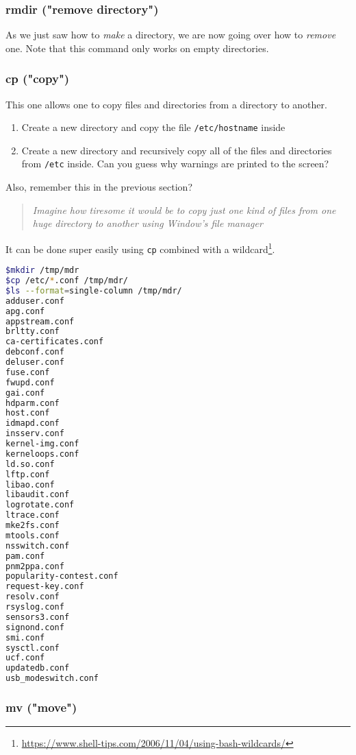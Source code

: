 \documentclass[12pt]{article}
\begin{document}
\subsubsection{rmdir ("remove directory")}

As we just saw how to \textit{make} a directory, we are now going over how to \textit{remove} one.
Note that this command only works on empty directories.

\subsubsection{cp ("copy")}

This one allows one to copy files and directories from a directory to another.
\begin{enumerate}
\item Create a new directory and copy the file \texttt{/etc/hostname} inside
\item Create a new directory and recursively copy all of the files and directories from \texttt{/etc} inside. Can you guess why warnings are printed to the screen?
\end{enumerate}

Also, remember this in the previous section?

\begin{quote}
\textit{Imagine how tiresome it would be to copy just one kind of files from one huge directory to another using Window's file manager}
\end{quote}

It can be done super easily using \texttt{cp} combined with a wildcard\footnote{\url{https://www.shell-tips.com/2006/11/04/using-bash-wildcards/}}.

\begin{lstlisting}[language=bash]
$mkdir /tmp/mdr
$cp /etc/*.conf /tmp/mdr/
$ls --format=single-column /tmp/mdr/
adduser.conf
apg.conf
appstream.conf
brltty.conf
ca-certificates.conf
debconf.conf
deluser.conf
fuse.conf
fwupd.conf
gai.conf
hdparm.conf
host.conf
idmapd.conf
insserv.conf
kernel-img.conf
kerneloops.conf
ld.so.conf
lftp.conf
libao.conf
libaudit.conf
logrotate.conf
ltrace.conf
mke2fs.conf
mtools.conf
nsswitch.conf
pam.conf
pnm2ppa.conf
popularity-contest.conf
request-key.conf
resolv.conf
rsyslog.conf
sensors3.conf
signond.conf
smi.conf
sysctl.conf
ucf.conf
updatedb.conf
usb_modeswitch.conf
\end{lstlisting}

\subsubsection{mv ("move")}
\end{document}

